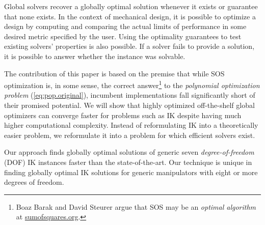 Global solvers recover a globally optimal solution whenever it exists or guarantee that none exists. In the context of mechanical design, it is possible to optimize a design by computing and comparing the actual limits of performance in some desired metric specified by the user. Using the optimality guarantees to test existing solvers' properties is also possible. If a solver fails to provide a solution, it is possible to answer whether the instance was solvable.

The contribution of this paper is based on the premise that while SOS optimization is, in some sense, the correct answer\footnote{Boaz Barak and David Steurer argue that SOS may be an \emph{optimal algorithm} at \href{https://web.archive.org/web/20240908151224/https://www.sumofsquares.org/public/lec-optimality-intro.pdf}{sumofsquares.org}.} to the \emph{polynomial optimization problem} (\ref{eq:pop.original}), incumbent implementations fall significantly short of their promised potential. We will show that highly optimized off-the-shelf global optimizers can converge faster for problems such as IK despite having much higher computational complexity. Instead of reformulating IK into a theoretically easier problem, we reformulate it into a problem for which efficient solvers exist.

Our approach finds globally optimal solutions of generic seven \emph{degree-of-freedom} (DOF) IK instances faster than the state-of-the-art. Our technique is unique in finding globally optimal IK solutions for generic manipulators with eight or more degrees of freedom.
